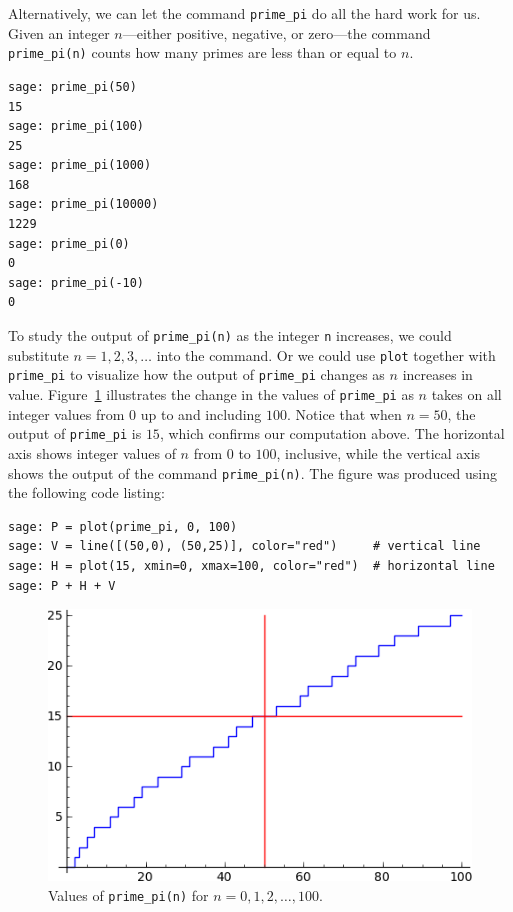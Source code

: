 Alternatively, we can let the command \verb!prime_pi! do all the hard
work for us. Given an integer $n$---either positive, negative, or
zero---the command \verb!prime_pi(n)! counts how many primes are less
than or equal to $n$.
%
\begin{lstlisting}
sage: prime_pi(50)
15
sage: prime_pi(100)
25
sage: prime_pi(1000)
168
sage: prime_pi(10000)
1229
sage: prime_pi(0)
0
sage: prime_pi(-10)
0
\end{lstlisting}
%
To study the output of \verb!prime_pi(n)! as the integer \verb!n!
increases, we could substitute $n = 1, 2, 3, \dots$ into the
command. Or we could use \verb!plot! together with \verb!prime_pi! to
visualize how the output of \verb!prime_pi! changes as $n$ increases
in value. Figure~\ref{fig:number_theory:prime_pi_for_n_leq_100}
illustrates the change in the values of \verb!prime_pi! as $n$ takes
on all integer values from $0$ up to and including $100$. Notice that
when $n = 50$, the output of \verb!prime_pi! is $15$, which confirms
our computation above. The horizontal axis shows integer values of $n$
from $0$ to $100$, inclusive, while the vertical axis shows the output
of the command \verb!prime_pi(n)!. The figure was produced using the
following code listing:
%
\begin{lstlisting}
sage: P = plot(prime_pi, 0, 100)
sage: V = line([(50,0), (50,25)], color="red")     # vertical line
sage: H = plot(15, xmin=0, xmax=100, color="red")  # horizontal line
sage: P + H + V
\end{lstlisting}
%
\begin{figure}[!htbp]
\centering
\includegraphics[scale=0.8]{images/prime-pi-100}
\caption{Values of \texttt{prime\_pi(n)} for $n = 0, 1, 2, \dots, 100$.}
\label{fig:number_theory:prime_pi_for_n_leq_100}
\end{figure}
